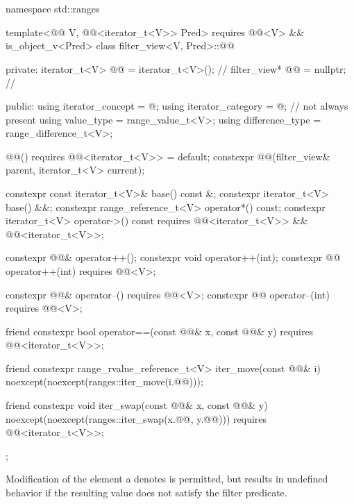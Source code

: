 %
\begin{codeblock}
namespace std::ranges {
  template<@@ V, @@<iterator_t<V>> Pred>
    requires @@<V> && is_object_v<Pred>
  class filter_view<V, Pred>::@@ {
  private:
    iterator_t<V> @@ = iterator_t<V>();   // \expos
    filter_view* @@ = nullptr;             // \expos

  public:
    using iterator_concept  = @\seebelownc@;
    using iterator_category = @\seebelownc@;        // not always present
    using value_type        = range_value_t<V>;
    using difference_type   = range_difference_t<V>;

    @@() requires @@<iterator_t<V>> = default;
    constexpr @@(filter_view& parent, iterator_t<V> current);

    constexpr const iterator_t<V>& base() const &;
    constexpr iterator_t<V> base() &&;
    constexpr range_reference_t<V> operator*() const;
    constexpr iterator_t<V> operator->() const
      requires @@<iterator_t<V>> && @@<iterator_t<V>>;

    constexpr @@& operator++();
    constexpr void operator++(int);
    constexpr @@ operator++(int) requires @@<V>;

    constexpr @@& operator--() requires @@<V>;
    constexpr @@ operator--(int) requires @@<V>;

    friend constexpr bool operator==(const @@& x, const @@& y)
      requires @@<iterator_t<V>>;

    friend constexpr range_rvalue_reference_t<V> iter_move(const @@& i)
      noexcept(noexcept(ranges::iter_move(i.@@)));

    friend constexpr void iter_swap(const @@& x, const @@& y)
      noexcept(noexcept(ranges::iter_swap(x.@@, y.@@)))
      requires @@<iterator_t<V>>;
  };
}
\end{codeblock}

\pnum
Modification of the element a  denotes is
permitted, but results in undefined behavior if the resulting value does not
satisfy the filter predicate.


